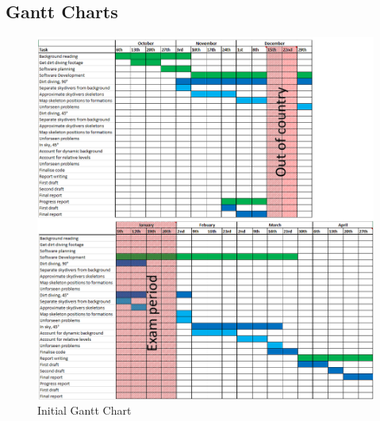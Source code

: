 \documentclass[a4paper, 12pt]{article}
\begin{document}
\begin{appendices}
%
\chapter{Gantt Charts}
\begin{figure}[H]
	\centering
	\includegraphics[width=\linewidth]{Gantt_initial_split.png}
	\caption{Initial Gantt Chart}
	\label{fig:gantt_initial}
\end{figure}
%
\end{appendices}
%
\end{document}
